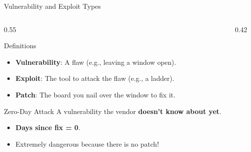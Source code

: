 \documentclass[aspectratio=169]{beamer}  %
\begin{document}
\begin{frame}{Vulnerability and Exploit Types}
    \begin{columns}[T]
        \begin{column}{0.55\textwidth}
            \begin{block}{Definitions}
                \footnotesize
                \begin{itemize}
                    \item \textbf{Vulnerability}: A flaw (e.g., leaving a window open).
                    \item \textbf{Exploit}: The tool to attack the flaw (e.g., a ladder).
                    \item \textbf{Patch}: The board you nail over the window to fix it.
                \end{itemize}
            \end{block}
            \begin{alertblock}{Zero-Day Attack}
                \footnotesize
                A vulnerability the vendor \textbf{doesn't know about yet}.
                \begin{itemize}
                    \item \textbf{Days since fix = 0}.
                    \item Extremely dangerous because there is no patch!
                \end{itemize}
            \end{alertblock}
        \end{column}
        \begin{column}{0.42\textwidth}
            \begin{center}
            \end{center}
            

\end{column}
\end{columns}
\end{frame}
\end{document}
